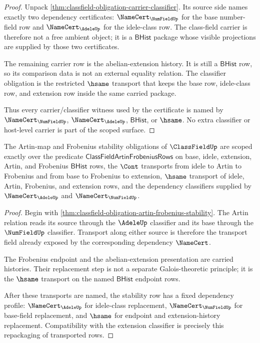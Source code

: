 \begin{proof}
Unpack \autoref{thm:classfield-obligation-carrier-classifier}. Its source side names exactly two dependency certificates: $\NameCert_{\NumFieldUp}$ for the base number-field row and $\NameCert_{\AdeleUp}$ for the idele-class row. The class-field carrier is therefore not a free ambient object; it is a $\mathsf{BHist}$ package whose visible projections are supplied by those two certificates.

The remaining carrier row is the abelian-extension history. It is still a $\mathsf{BHist}$ row, so its comparison data is not an external equality relation. The classifier obligation is the restricted $\hsame$ transport that keeps the base row, idele-class row, and extension row inside the same carried package.

Thus every carrier/classifier witness used by the certificate is named by $\NameCert_{\NumFieldUp}$, $\NameCert_{\AdeleUp}$, $\mathsf{BHist}$, or $\hsame$. No extra classifier or host-level carrier is part of the scoped surface.
\end{proof}

\begin{theorem}\label{thm:classfield-scoped-artin-frobenius-stability}
The Artin-map and Frobenius stability obligations of $\ClassFieldUp$ are scoped exactly over the predicate $\mathsf{ClassFieldArtinFrobeniusRows}$ on base, idele, extension, Artin, and Frobenius $\mathsf{BHist}$ rows, the $\Cont$ transports from idele to Artin to Frobenius and from base to Frobenius to extension, $\hsame$ transport of idele, Artin, Frobenius, and extension rows, and the dependency classifiers supplied by $\NameCert_{\AdeleUp}$ and $\NameCert_{\NumFieldUp}$.
\end{theorem}

\begin{proof}
Begin with \autoref{thm:classfield-obligation-artin-frobenius-stability}. The Artin relation reads its source through the $\AdeleUp$ classifier and its base through the $\NumFieldUp$ classifier. Transport along either source is therefore the transport field already exposed by the corresponding dependency $\NameCert$.

The Frobenius endpoint and the abelian-extension presentation are carried histories. Their replacement step is not a separate Galois-theoretic principle; it is the $\hsame$ transport on the named $\mathsf{BHist}$ endpoint rows.

After these transports are named, the stability row has a fixed dependency profile: $\NameCert_{\AdeleUp}$ for idele-class replacement, $\NameCert_{\NumFieldUp}$ for base-field replacement, and $\hsame$ for endpoint and extension-history replacement. Compatibility with the extension classifier is precisely this repackaging of transported rows.
\end{proof}


